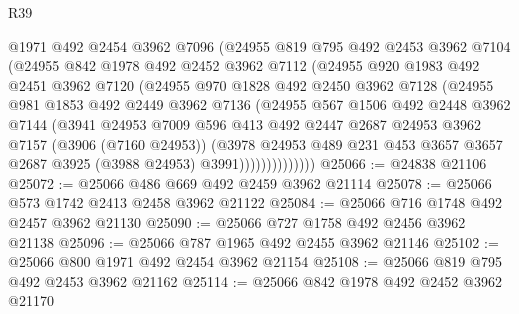 \begin{lexlean}{R39}
\begin{coremodule}
                @1971
                @492
                @2454
                @3962
                @7096
                (@24955
                  @819
                  @795
                  @492
                  @2453
                  @3962
                  @7104
                  (@24955
                    @842
                    @1978
                    @492
                    @2452
                    @3962
                    @7112
                    (@24955
                      @920
                      @1983
                      @492
                      @2451
                      @3962
                      @7120
                      (@24955
                        @970
                        @1828
                        @492
                        @2450
                        @3962
                        @7128
                        (@24955
                          @981
                          @1853
                          @492
                          @2449
                          @3962
                          @7136
                          (@24955
                            @567
                            @1506
                            @492
                            @2448
                            @3962
                            @7144
                            (@3941
                              @24953
                              @7009
                              @596
                              @413
                              @492
                              @2447
                              @2687
                              @24953
                              @3962
                              @7157
                              (@3906 (@7160 @24953))
                              (@3978
                                @24953
                                @489
                                @231
                                @453
                                @3657
                                @3657
                                @2687
                                @3925
                                (@3988 @24953)
                                @3991))))))))))))))
@25066 := @24838 @21106
@25072 := @25066 @486 @669 @492 @2459 @3962 @21114
@25078 := @25066 @573 @1742 @2413 @2458 @3962 @21122
@25084 := @25066 @716 @1748 @492 @2457 @3962 @21130
@25090 := @25066 @727 @1758 @492 @2456 @3962 @21138
@25096 := @25066 @787 @1965 @492 @2455 @3962 @21146
@25102 := @25066 @800 @1971 @492 @2454 @3962 @21154
@25108 := @25066 @819 @795 @492 @2453 @3962 @21162
@25114 := @25066 @842 @1978 @492 @2452 @3962 @21170

\end{coremodule}
\end{lexlean}

